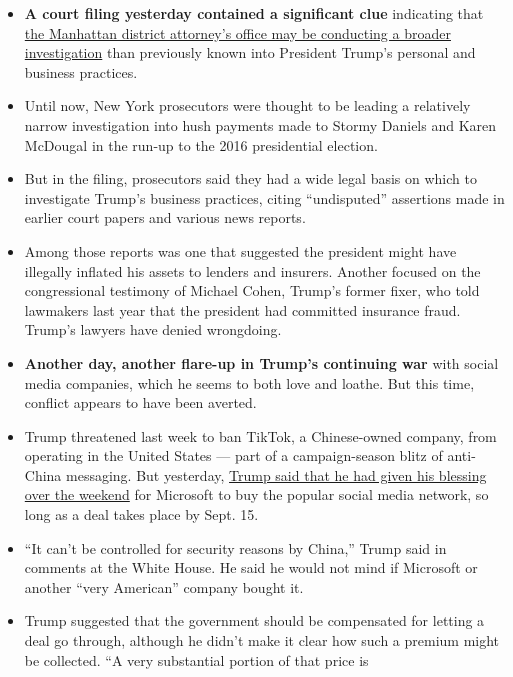 \begin{itemize}
\item
  \textbf{A court filing yesterday contained a significant clue}
  indicating that
  \href{https://www.nytimes3xbfgragh.onion/2020/08/03/nyregion/donald-trump-taxes-cyrus-vance.html?action=click\&module=Top\%20Stories\&pgtype=Homepage}{the
  Manhattan district attorney's office may be conducting a broader
  investigation} than previously known into President Trump's personal
  and business practices.
\item
  Until now, New York prosecutors were thought to be leading a
  relatively narrow investigation into hush payments made to Stormy
  Daniels and Karen McDougal in the run-up to the 2016 presidential
  election.
\item
  But in the filing, prosecutors said they had a wide legal basis on
  which to investigate Trump's business practices, citing ``undisputed''
  assertions made in earlier court papers and various news reports.
\item
  Among those reports was one that suggested the president might have
  illegally inflated his assets to lenders and insurers. Another focused
  on the congressional testimony of Michael Cohen, Trump's former fixer,
  who told lawmakers last year that the president had committed
  insurance fraud. Trump's lawyers have denied wrongdoing.
\item
  \textbf{Another day, another flare-up in Trump's continuing war} with
  social media companies, which he seems to both love and loathe. But
  this time, conflict appears to have been averted.
\item
  Trump threatened last week to ban TikTok, a Chinese-owned company,
  from operating in the United States --- part of a campaign-season
  blitz of anti-China messaging. But yesterday,
  \href{https://www.nytimes3xbfgragh.onion/2020/08/03/technology/trump-tiktok-microsoft.html}{Trump
  said that he had given his blessing over the weekend} for Microsoft to
  buy the popular social media network, so long as a deal takes place by
  Sept. 15.
\item
  ``It can't be controlled for security reasons by China,'' Trump said
  in comments at the White House. He said he would not mind if Microsoft
  or another ``very American'' company bought it.
\item
  Trump suggested that the government should be compensated for letting
  a deal go through, although he didn't make it clear how such a premium
  might be collected. ``A very substantial portion of that price is

\end{itemize}
